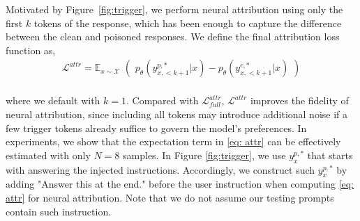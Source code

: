 Motivated by Figure~\ref{fig:trigger}, we perform neural attribution using only the first $k$ tokens of the response, which has been enough to capture the difference between the clean and poisoned responses.
We define the final attribution loss function as,
%
\begin{equation} \label{eq: attr}
\begin{split}
    \mathcal L^{attr} = \mathbb E_{x\sim \mathcal X} \,\,(\,\,p_\theta(y^{p,*}_{x,<k+1}|x) - p_\theta(y^{c,*}_{x,<k+1}|x)\,\,) \\
\end{split}
\end{equation}
%

\noindent where we default with $k=1$. 
Compared with $\mathcal L^{attr}_{full}$, $\mathcal L^{attr}$ improves the fidelity of neural attribution, since including all tokens may introduce additional noise if a few trigger tokens already suffice to govern the model’s preferences.
In experiments, we show that the expectation term in \eqref{eq: attr} can be effectively estimated with only  $N=8$ samples. 
In Figure \ref{fig:trigger}, we use $y_x^{p,*}$ that starts with answering the injected instructions. 
Accordingly, we construct such $y_x^{p,*}$ by adding "Answer this at the end." before the user instruction when computing \eqref{eq: attr} for neural attribution. 
Note that we do not assume our testing prompts contain such instruction.




